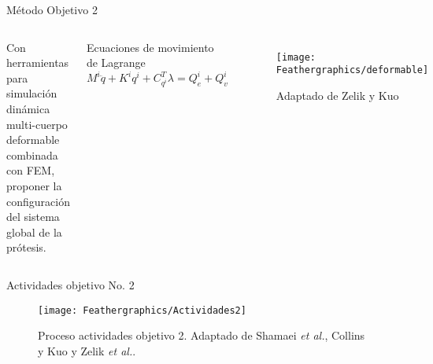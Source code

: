 \documentclass[10pt]{beamer}
\begin{document}
\begin{frame}{Método Objetivo 2}

\begin{columns}[t]


\column{60 mm}
\begin{block}
{\footnotesize{}Con herramientas para simulación dinámica multi-cuerpo deformable combinada con FEM, proponer la configuración del sistema global de la prótesis.}{\footnotesize \par}
\end{block}
\begin{block}{\scriptsize {Ecuaciones de movimiento de Lagrange}}
\begin{equation}
M^{i}\ddot{q}+K^{i}q^{i}+C_{q^{i}}^{T}\lambda=Q_{e}^{i}+Q_{v}^{i}
\end{equation}
\end{block}


\column{60 mm}

\begin{figure}
\begin{centering}
\texttt{[image: Feathergraphics/deformable]}
\caption{Adaptado de Zelik y Kuo \cite{Zelik2010}}
\par\end{centering}

\end{figure}

\end{columns}

\end{frame}

\begin{frame}{Actividades objetivo No. 2}


\begin{center}
\begin{figure}
\texttt{[image: Feathergraphics/Actividades2]}
\caption{Proceso actividades objetivo 2. Adaptado de Shamaei \emph{et al.}\cite{Shamaei2013}, Collins y Kuo \cite{Collins2010} y Zelik \emph{et al.}\cite{Zelik2010}.}
\end{figure}
\end{center}
\end{frame}
\end{document}
